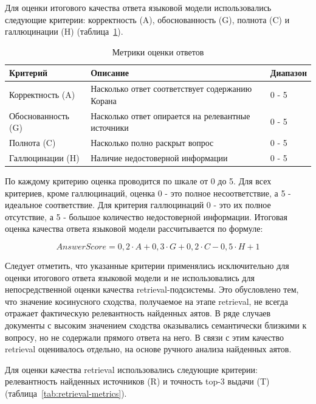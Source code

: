 Для оценки итогового качества ответа языковой модели использовались следующие критерии: корректность (A), обоснованность (G), полнота (C) и галлюцинации (H) (таблица~\ref{tab:answer-metrics}).

\begin{table}[H]
	\centering
	\caption{Метрики оценки ответов}
	\label{tab:answer-metrics}
	\small
	\begin{tabular}{|p{4cm}|p{4cm}|p{4cm}|}
	\hline
		Критерий & Описание & Диапазон \\
	\hline
		Корректность (A) & Насколько ответ соответствует содержанию Корана & 0 - 5 \\
	\hline
		Обоснованность (G) & Насколько ответ опирается на релевантные источники & 0 - 5 \\
	\hline
		Полнота (C) & Насколько полно раскрыт вопрос & 0 - 5 \\
	\hline
		Галлюцинации (H) & Наличие недостоверной информации & 0 - 5 \\
	\hline
	\end{tabular}
\end{table}

По каждому критерию оценка проводится по шкале от 0 до 5. Для всех критериев, кроме галлюцинаций, оценка 0 - это полное несоответствие, а 5 - идеальное соответствие. Для критерия галлюцинаций 0 - это их полное отсутствие, а 5 - большое количество недостоверной информации. Итоговая оценка качества ответа языковой модели рассчитывается по формуле:

\begin{equation}
	AnswerScore = 0{,}2 \cdot A + 0{,}3 \cdot G + 0{,}2 \cdot C - 0{,}5 \cdot H + 1
	\label{eq:answer-score}
\end{equation}

Следует отметить, что указанные критерии применялись исключительно для оценки итогового ответа языковой модели и не использовались для непосредственной оценки качества retrieval-подсистемы. Это обусловлено тем, что значение косинусного сходства, получаемое на этапе retrieval, не всегда отражает фактическую релевантность найденных аятов. В ряде случаев документы с высоким значением сходства оказывались семантически близкими к вопросу, но не содержали прямого ответа на него. В связи с этим качество retrieval оценивалось отдельно, на основе ручного анализа найденных аятов.

Для оценки качества retrieval использовались следующие критерии: релевантность найденных источников (R) и точность top-3 выдачи (T) (таблица~\ref{tab:retrieval-metrics}).

